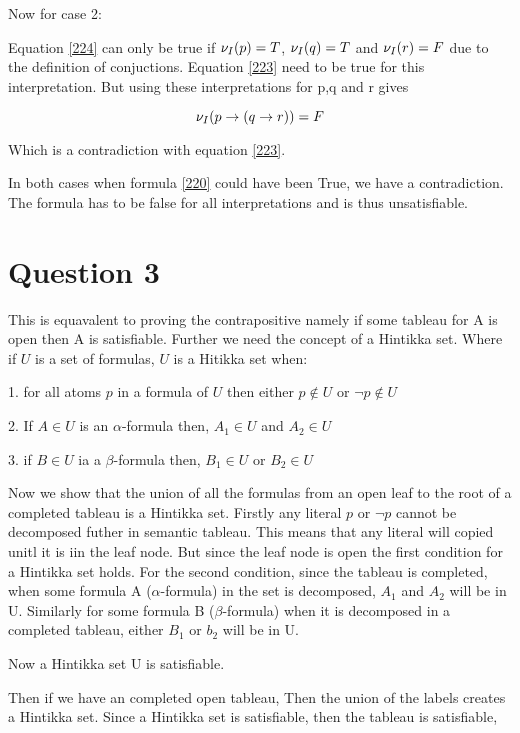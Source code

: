 \documentclass[10pt,a4paper]{article}
\begin{document}
Now for case 2:

Equation \ref{224} can only be true if $\nu_I(p) = T$, $\nu_I(q) = T$ and $\nu_I(r) = F$ due to the definition of conjuctions. 
Equation \ref{223} need to be true for this interpretation. But using these interpretations for p,q and r gives

\begin{equation}
\nu_I(p \rightarrow ( q \rightarrow r )) = F
\end{equation}

Which is a contradiction with equation \ref{223}.

In both cases when formula \ref{220} could have been True, we have a contradiction. 
The formula has to be false for all interpretations and is thus unsatisfiable.





\section{Question 3}

This is equavalent to proving the contrapositive namely if some tableau for A is open then A is satisfiable. Further we need the concept of a Hintikka set. Where if $U$ is a set of formulas, $U$ is a Hitikka set when:

1. for all atoms $p$ in a formula of $U$ then either $p \notin U$ or $\neg p \notin U$

2. If $A \in U$ is an $\alpha$-formula then, $A_1 \in U$ and $A_2 \in U$

3. if $B \in U$ ia a $\beta$-formula then, $B_1 \in U$ or $B_2 \in U$ 

Now we show that the union of all the formulas from an open leaf to the root of a completed tableau is a Hintikka set. Firstly any literal $p$ or $\neg p$ cannot be decomposed futher in semantic tableau. This means that any literal will copied unitl it is iin the leaf node. But since the leaf node is open the first condition for a Hintikka set holds. For the second condition, since the tableau is completed, when some formula A ($\alpha$-formula) in the set is decomposed, $A_1$ and $A_2$ will be in U. Similarly for some formula B ($\beta$-formula) when it is decomposed in a completed tableau, either $B_1$ or $b_2$ will be in U.

Now a Hintikka set U is satisfiable.

Then if we have an completed open tableau, Then the union of the labels creates a Hintikka set. Since a Hintikka set is satisfiable, then the tableau is satisfiable,  
\end{document}

